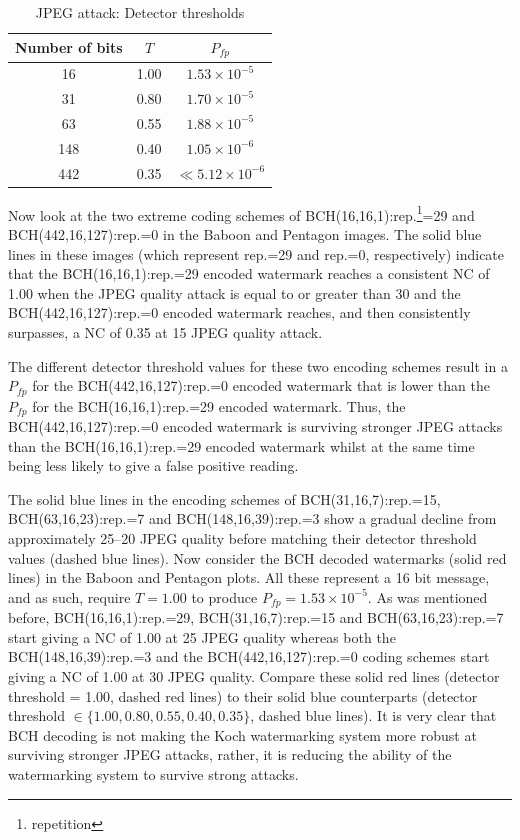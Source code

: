 \documentclass[12pt]{report}
\begin{document}
\begin{table}[htb]
\scriptsize
    \begin{center}
	\begin{tabular}{|c|c|c|} \hline
		Number of bits	& $T$	& $P_{fp}$		\\ \hline
		16		& 1.00	& $1.53 \times 10^{-5}$ \\ \hline
		31		& 0.80	& $1.70 \times 10^{-5}$ \\ \hline
		63		& 0.55	& $1.88 \times 10^{-5}$ \\ \hline
		148		& 0.40	& $1.05 \times 10^{-6}$ \\ \hline
		442		& 0.35	& $\ll 5.12 \times 10^{-6}$ \\ \hline
	\end{tabular}
	\caption{JPEG attack: Detector thresholds}
	\label{tab:NwTPfpBK}
    \end{center}
\end{table}
\normalsize

Now look at the two extreme coding schemes of BCH(16,16,1):rep.\footnote{repetition}=29 and BCH(442,16,127):rep.=0 in the Baboon and
Pentagon images. The solid blue lines in these images (which represent rep.=29 and rep.=0, respectively) indicate that 
the BCH(16,16,1):rep.=29 encoded watermark reaches a consistent NC of 1.00 when the JPEG quality attack is equal to or greater than 30
and the BCH(442,16,127):rep.=0 encoded watermark reaches, and then consistently surpasses, a NC of 0.35 at 
15 JPEG quality attack. 

The different detector threshold values for these two encoding schemes result in a $P_{fp}$ for the
BCH(442,16,127):rep.=0 encoded watermark that is lower than the $P_{fp}$ for the BCH(16,16,1):rep.=29 encoded watermark.
Thus, the BCH(442,16,127):rep.=0 encoded watermark is surviving stronger JPEG attacks than the BCH(16,16,1):rep.=29 encoded watermark
whilst at the same time being less likely to give a false positive reading.

The solid blue lines in the encoding schemes of BCH(31,16,7):rep.=15, BCH(63,16,23):rep.=7 and BCH(148,16,39):rep.=3 show a gradual decline
from approximately 25--20 JPEG quality before matching their detector threshold values (dashed blue lines).
Now consider the BCH decoded watermarks (solid red lines) in the Baboon and Pentagon plots. All these represent 
a 16 bit message, and as such, require $T=1.00$ to produce $P_{fp}=1.53 \times 10^{-5}$. As was mentioned before,
BCH(16,16,1):rep.=29, BCH(31,16,7):rep.=15 and BCH(63,16,23):rep.=7 start giving
a NC of 1.00 at 25 JPEG quality whereas both the BCH(148,16,39):rep.=3 and the 
BCH(442,16,127):rep.=0 coding schemes start giving a NC of 1.00 at 30 JPEG quality. Compare these solid red lines
(detector threshold = 1.00, dashed red lines) to their solid blue counterparts 
(detector threshold $\in \{1.00, 0.80, 0.55, 0.40, 0.35\}$, dashed blue lines).
It is very clear that BCH decoding is not making the Koch watermarking system
more robust at surviving stronger JPEG attacks, rather, it is reducing the ability of the watermarking system to survive strong attacks.
\end{document}
